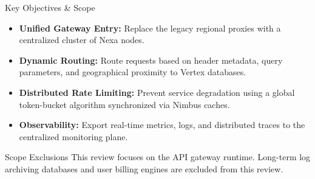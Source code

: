 \begin{frame}{Key Objectives \& Scope}
  \begin{itemize}
    \item[\faCheckCircle] \textbf{Unified Gateway Entry:} Replace the legacy regional proxies with a centralized cluster of Nexa nodes.
    \item[\faCheckCircle] \textbf{Dynamic Routing:} Route requests based on header metadata, query parameters, and geographical proximity to Vertex databases.
    \item[\faCheckCircle] \textbf{Distributed Rate Limiting:} Prevent service degradation using a global token-bucket algorithm synchronized via Nimbus caches.
    \item[\faCheckCircle] \textbf{Observability:} Export real-time metrics, logs, and distributed traces to the centralized monitoring plane.
  \end{itemize}
  \vspace{0.4cm}
  \begin{designcard}[colback=secondary!5,colframe=secondary!30]{Scope Exclusions}
    This review focuses on the API gateway runtime. Long-term log archiving databases and user billing engines are excluded from this review.
  \end{designcard}
\end{frame}
